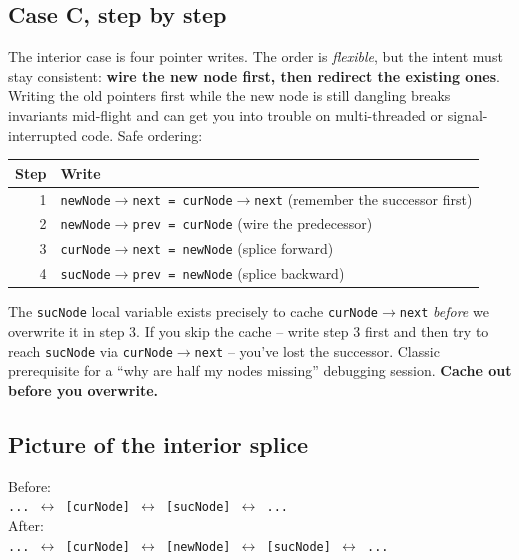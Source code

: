 \documentclass[11pt]{article}
\begin{document}
\subsection*{Case C, step by step}

The interior case is four pointer writes. The order is
\emph{flexible}, but the intent must stay consistent: \textbf{wire
the new node first, then redirect the existing ones}. Writing the
old pointers first while the new node is still dangling breaks
invariants mid-flight and can get you into trouble on multi-threaded
or signal-interrupted code. Safe ordering:

\begin{center}
\footnotesize
\renewcommand{\arraystretch}{1.3}
\begin{tabular}{@{}rl@{}}
\hline
\textbf{Step} & \textbf{Write} \\
\hline
1 & \texttt{newNode$\to$next = curNode$\to$next}  (remember the successor first) \\
2 & \texttt{newNode$\to$prev = curNode}            (wire the predecessor) \\
3 & \texttt{curNode$\to$next = newNode}            (splice forward) \\
4 & \texttt{sucNode$\to$prev = newNode}            (splice backward) \\
\hline
\end{tabular}
\end{center}

\begin{warnbox}
The \texttt{sucNode} local variable exists precisely to cache
\texttt{curNode$\to$next} \emph{before} we overwrite it in step 3.
If you skip the cache -- write step 3 first and then try to reach
\texttt{sucNode} via \texttt{curNode$\to$next} -- you've lost the
successor. Classic prerequisite for a ``why are half my nodes
missing'' debugging session. \textbf{Cache out before you
overwrite.}
\end{warnbox}

\subsection{Picture of the interior splice}

\begin{center}
\footnotesize
Before:\\
\texttt{... $\leftrightarrow$ [curNode] $\leftrightarrow$ [sucNode] $\leftrightarrow$ ...}
\\[0.5em]
After:\\
\texttt{... $\leftrightarrow$ [curNode] $\leftrightarrow$ [newNode] $\leftrightarrow$ [sucNode] $\leftrightarrow$ ...}
\end{center}
\end{document}
